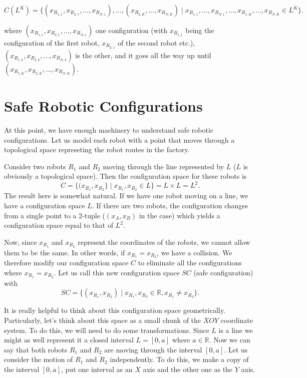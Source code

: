 \documentclass[12pt]{article}
\newcommand{\reals}{\mathbb{R}}                  %
\theoremstyle{definition}
\begin{document}
$$C(L^K) = \{(x_{R_{1, 1}}, x_{R_{2, 1}}, \dots, x_{R_{N, 1}}), \dots, (x_{R_{2, K}}, \dots, x_{R_{N, K}}) \mid x_{R_{1, 1}}, \dots, x_{R_{N, 1}}, \dots, x_{R_{1, K}}, \dots, x_{R_{N, K}} \in L^K\}.$$

where $(x_{R_{1, 1}}, x_{R_{2, 1}}, \dots, x_{R_{N, 1}})$ one configuration (with $x_{R_{1, 1}}$ being the configuration of the first robot, $x_{R_{2, 1}}$ of the second robot etc.), $(x_{R_{1, 2}}, x_{R_{2, 2}}, \dots, x_{R_{N, 2}})$ is the other, and it goes all
the way up until $(x_{R_{1, K}}, x_{R_{2, K}}, \dots, x_{R_{N, K}})$.


\section*{\centering Safe Robotic Configurations}
At this point, we have enough machinery to understand safe robotic configurations.
Let us model each robot with a point that moves through a topological space represeting
the robot routes in the factory.

\bigskip

Consider two robots $R_1$ and $R_2$ moving through the line represented by $L$ ($L$ is obviously a topological space).
Then the configuration space for these robots is
$$C = \{(x_{R_1}, x_{R_2}\} \mid x_{R_1}, x_{R_2} \in L\} = L \times L = L^2.$$
The result here is somewhat natural. If we have one robot moving on a line, we have a configuration
space $L$. If there are two robots, the configuration changes from a single point to a 2-tuple ($(x_A, x_B)$ in the case)
which yields a configuration space equal to that of $L^2$.

\bigskip

Now, since $x_{R_1}$ and $x_{R_2}$ represent the coordinates of the robots, we cannot allow them to be the same.
In other words, if $x_{R_1} = x_{R_2}$, we have a collision. We therefore modify our configuration space $C$
to eliminate all the configurations where $x_{R_1} = x_{R_2}$. Let us call this new configuration space $SC$
(safe configuration) with
$$SC = \{(x_{R_1}, x_{R_2}) \mid x_{R_1}, x_{R_2} \in \reals, x_{R_1} \neq x_{R_2}\}.$$

\bigskip

It is really helpful to think about this configuration space geometrically.
Particularly, let's think about this space as a small chunk of the $XOY$ coordinate system.
To do this, we will need to do some transformations. Since $L$ is a line we might as well
represent it a closed interval $L = [0, a]$ where $a \in \reals$. Now we can say that both
robots $R_1$ and $R_2$ are moving through the interval $[0, a]$.
Let us consider the motion of $R_1$ and $R_2$ independently. To do this, we make a copy
of the interval $[0, a]$, put one interval as an $X$ axis and the other one as the $Y$ axis.
\end{document}
